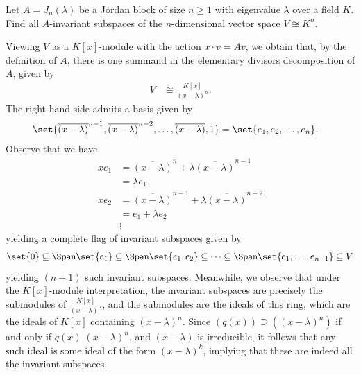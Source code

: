 \documentclass[10pt]{mypackage}
\begin{document}
\begin{problem}[Problem 4]
  Let $A = J_n\left( \lambda \right)$ be a Jordan block of size $n\geq 1$ with eigenvalue $\lambda$ over a field $K$. Find all $A$-invariant subspaces of the $n$-dimensional vector space $V\cong K^n$.
\end{problem}
\begin{solution}
  Viewing $V$ as a $K[x]$-module with the action $x\cdot v = Av$, we obtain that, by the definition of $A$, there is one summand in the elementary divisors decomposition of $A$, given by
  \begin{align*}
    V &\cong \frac{K[x]}{\left( x-\lambda \right)^{n}}.
  \end{align*}
  The right-hand side admits a basis given by
  \begin{align*}
    \set{ \overline{\left( x-\lambda \right)}^{n-1}, \overline{\left( x-\lambda \right)}^{n-2},\dots, \overline{\left( x-\lambda \right)}, \overline{1} } &= \set{e_1,e_2,\dots,e_n}.
  \end{align*}
  Observe that we have
  \begin{align*}
    x e_1 &= \overline{\left( x-\lambda \right)}^{n} + \lambda \overline{\left( x-\lambda \right)}^{n-1}\\
          &= \lambda e_1\\
    x e_2 &= \overline{ \left( x-\lambda \right) }^{n-1} + \lambda \overline{\left( x-\lambda \right)}^{n-2}\\
          &= e_1 + \lambda e_2\\
          &\vdots
  \end{align*}
  yielding a complete flag of invariant subspaces given by
  \begin{align*}
    \set{0}\subseteq \Span\set{e_1}\subseteq\Span\set{e_1,e_2}\subseteq\cdots\subseteq \Span\set{e_1,\dots,e_{n-1}}\subseteq V,
  \end{align*}
  yielding $\left( n+1 \right)$ such invariant subspaces. Meanwhile, we observe that under the $K[x]$-module interpretation, the invariant subspaces are precisely the submodules of $\frac{K[x]}{\left( x-\lambda \right)^{n}}$, and the submodules are the ideals of this ring, which are the ideals of $K[x]$ containing $\left( x-\lambda \right)^{n}$. Since $\left( q(x) \right)\supseteq \left( \left( x-\lambda \right)^{n} \right)$ if and only if $q(x) | \left( x-\lambda \right)^{n}$, and $\left( x-\lambda \right)$ is irreducible, it follows that any such ideal is some ideal of the form $\left( x-\lambda \right)^{k}$, implying that these are indeed all the invariant subspaces.
\end{solution}
\end{document}
